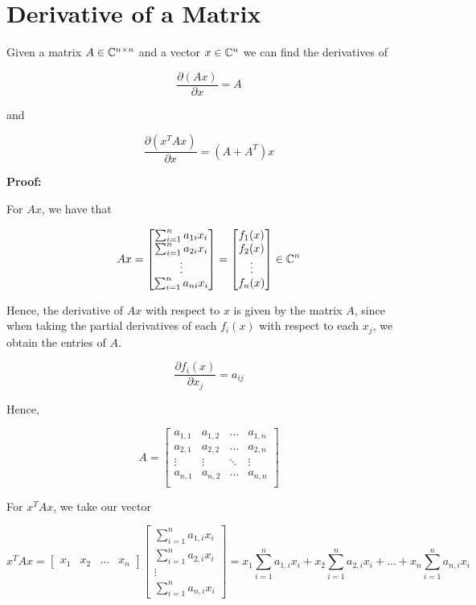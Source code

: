 \section{Derivative of a Matrix}

Given a matrix \(A \in \mathbb{C}^{n \times n}\) and a vector \(x \in \mathbb{C}^{n}\) we can find the 
derivatives of 

\[
    \frac{\partial (Ax)}{\partial x} = A
\] 

and 

\[
    \frac{\partial (x^T A x)}{\partial x} = (A + A^T)x
\]

\textbf{Proof:}

For \(Ax\), we have that 

\[
    Ax = 
    \begin{bmatrix}
        \sum_{i = 1}^{n} a_{1i} x_i \\
        \sum_{i = 1}^{n} a_{2i} x_i \\
        \vdots \\
        \sum_{i = 1}^{n} a_{ni} x_i 
    \end{bmatrix}
    = 
    \begin{bmatrix}
        f_1(x) \\
        f_2(x) \\
        \vdots \\
        f_n(x)
    \end{bmatrix}
    \in \mathbb{C}^{n}
\]

Hence, the derivative of \(Ax\) with respect to \(x\) is given by the matrix \(A\), since when 
taking the partial derivatives of each \(f_i(x)\) with respect to each \(x_j\), we obtain the entries of \(A\).

\[
    \frac{\partial f_i(x)}{\partial x_j} = a_{ij}
\]

Hence, 

\[
    A =
    \begin{bmatrix}
        a_{1,1} & a_{1,2} & \dots  & a_{1,n} \\
        a_{2,1} & a_{2,2} & \dots  & a_{2,n} \\
        \vdots & \vdots & \ddots & \vdots \\
        a_{n,1} & a_{n,2} & \dots  & a_{n,n} \\
    \end{bmatrix}
\]

For \(x^TAx\), we take our vector

\[
    x^T Ax
    = 
    \begin{bmatrix}
        x_1 & x_2 & \dots & x_n
    \end{bmatrix}
    \begin{bmatrix}
        \sum_{i = 1}^{n} a_{1,i} x_i \\
        \sum_{i = 1}^{n} a_{2,i} x_i \\
        \vdots \\
        \sum_{i = 1}^{n} a_{n,i} x_i 
    \end{bmatrix}
    = x_1 \sum_{i = 1}^{n} a_{1,i} x_i + x_2 \sum_{i = 1}^{n} a_{2,i} x_i + \dots + x_n \sum_{i = 1}^{n} a_{n,i} x_i
\]

